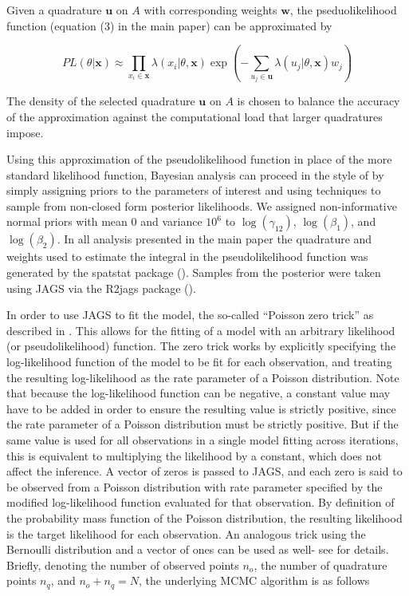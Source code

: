 \documentclass[
]{book}
\begin{document}
Given a quadrature \({\mathbf{u}}\) on \(A\) with corresponding weights \({\mathbf{w}}\), the pseduolikelihood function (equation (3) in the main paper) can be approximated by

\begin{equation}
\label{eqn:PL_approx}
PL(\theta | {\mathbf{x}}) \approx
\prod_{x_i \in {\mathbf{x}}} \lambda(x_i | \theta, {\mathbf{x}}) \exp(-\sum_{u_j \in {\mathbf{u}}} \lambda(u_j | \theta, {\mathbf{x}}) w_j) \tag{S1}
\end{equation}

The density of the selected quadrature \({\mathbf{u}}\) on \(A\) is chosen to balance the accuracy of the approximation against the computational load that larger quadratures impose.

Using this approximation of the pseudolikelihood function in place of the more standard likelihood function, Bayesian analysis can proceed in the style of \citet{King12} by simply assigning priors to the parameters of interest and using techniques to sample from non-closed form posterior likelihoods. We assigned non-informative normal priors with mean 0 and variance \(10^6\) to \(\log(\gamma_{12})\), \(\log(\beta_1)\), and \(\log(\beta_2)\). In all analysis presented in the main paper the quadrature and weights used to estimate the integral in the pseudolikelihood function was generated by the spatstat package (\citet{BT05}). Samples from the posterior were taken using JAGS via the R2jags package (\citet{Su15}).

In order to use JAGS to fit the model, the so-called ``Poisson zero trick'' as described in \citet{Kruschke14}. This allows for the fitting of a model with an arbitrary likelihood (or pseudolikelihood) function. The zero trick works by explicitly specifying the log-likelihood function of the model to be fit for each observation, and treating the resulting log-likelihood as the rate parameter of a Poisson distribution. Note that because the log-likelihood function can be negative, a constant value may have to be added in order to ensure the resulting value is strictly positive, since the rate parameter of a Poisson distribution must be strictly positive. But if the same value is used for all observations in a single model fitting across iterations, this is equivalent to multiplying the likelihood by a constant, which does not affect the inference. A vector of zeros is passed to JAGS, and each zero is said to be observed from a Poisson distribution with rate parameter specified by the modified log-likelihood function evaluated for that observation. By definition of the probability mass function of the Poisson distribution, the resulting likelihood is the target likelihood for each observation. An analogous trick using the Bernoulli distribution and a vector of ones can be used as well- see \citet{Kruschke14} for details. Briefly, denoting the number of observed points \(n_o\), the number of quadrature points \(n_q\), and \(n_o + n_q = N\), the underlying MCMC algorithm is as follows
\end{document}
